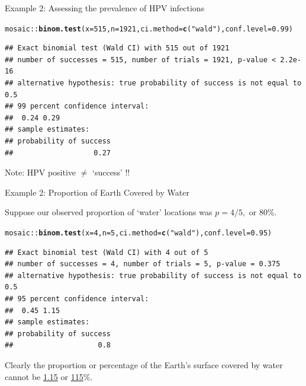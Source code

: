 \documentclass[10pt,handout]{beamer}\usepackage[]{graphicx}\usepackage[]{color}
\makeatletter
\newcommand{\hlnum}[1]{\textcolor[rgb]{0.686,0.059,0.569}{#1}}%
\newcommand{\hlstr}[1]{\textcolor[rgb]{0.192,0.494,0.8}{#1}}%
\newcommand{\hlopt}[1]{\textcolor[rgb]{0,0,0}{#1}}%
\newcommand{\hlstd}[1]{\textcolor[rgb]{0.345,0.345,0.345}{#1}}%
\newcommand{\hlkwc}[1]{\textcolor[rgb]{0.333,0.667,0.333}{#1}}%
\newcommand{\hlkwd}[1]{\textcolor[rgb]{0.737,0.353,0.396}{\textbf{#1}}}%
\newenvironment{kframe}{%
 \def\at@end@of@kframe{}%
 \ifinner\ifhmode%
  \def\at@end@of@kframe{\end{minipage}}%
  \begin{minipage}{\columnwidth}%
 \fi\fi%
 \def\FrameCommand##1{\hskip\@totalleftmargin \hskip-\fboxsep
 \colorbox{shadecolor}{##1}\hskip-\fboxsep
     \hskip-\linewidth \hskip-\@totalleftmargin \hskip\columnwidth}%
 \MakeFramed {\advance\hsize-\width
   \@totalleftmargin\z@ \linewidth\hsize
   \@setminipage}}%
 {\par\unskip\endMakeFramed%
 \at@end@of@kframe}
\newenvironment{knitrout}{}{} %
\makeatother
\begin{document}
\begin{frame}[fragile]{Example 2: Assessing the prevalence of HPV infections}
	
\begin{knitrout}\tiny
{}\color{fgcolor}\begin{kframe}
\begin{alltt}
\hlstd{mosaic}\hlopt{::}\hlkwd{binom.test}\hlstd{(}\hlkwc{x} \hlstd{=} \hlnum{515}\hlstd{,} \hlkwc{n} \hlstd{=} \hlnum{1921}\hlstd{,} \hlkwc{ci.method}\hlstd{=}\hlkwd{c}\hlstd{(}\hlstr{"wald"}\hlstd{),} \hlkwc{conf.level}\hlstd{=}\hlnum{0.99}\hlstd{)}
\end{alltt}
\begin{verbatim}
## Exact binomial test (Wald CI) with 515 out of 1921 
## number of successes = 515, number of trials = 1921, p-value < 2.2e-16
## alternative hypothesis: true probability of success is not equal to 0.5 
## 99 percent confidence interval:
##  0.24 0.29 
## sample estimates:
## probability of success 
##                   0.27
\end{verbatim}
\end{kframe}
\end{knitrout}
	Note: HPV positive $\ne$ `success' !!
\end{frame}



\begin{frame}[fragile]{Example 2: Proportion of Earth Covered by Water}
	
	Suppose our observed proportion of `water' locations was $p = 4/5,$ or 80\%.
	
\begin{knitrout}\tiny
{}\color{fgcolor}\begin{kframe}
\begin{alltt}
\hlstd{mosaic}\hlopt{::}\hlkwd{binom.test}\hlstd{(}\hlkwc{x} \hlstd{=} \hlnum{4}\hlstd{,} \hlkwc{n} \hlstd{=} \hlnum{5}\hlstd{,} \hlkwc{ci.method}\hlstd{=}\hlkwd{c}\hlstd{(}\hlstr{"wald"}\hlstd{),} \hlkwc{conf.level}\hlstd{=}\hlnum{0.95}\hlstd{)}
\end{alltt}
\begin{verbatim}
## Exact binomial test (Wald CI) with 4 out of 5 
## number of successes = 4, number of trials = 5, p-value = 0.375
## alternative hypothesis: true probability of success is not equal to 0.5 
## 95 percent confidence interval:
##  0.45 1.15 
## sample estimates:
## probability of success 
##                    0.8
\end{verbatim}
\end{kframe}
\end{knitrout}
	
	\pause 
	
	Clearly  the proportion or percentage of the Earth's surface covered by water cannot
	be \underline{1.15} or \underline{115}\%.  
	
\end{frame}
\end{document}
